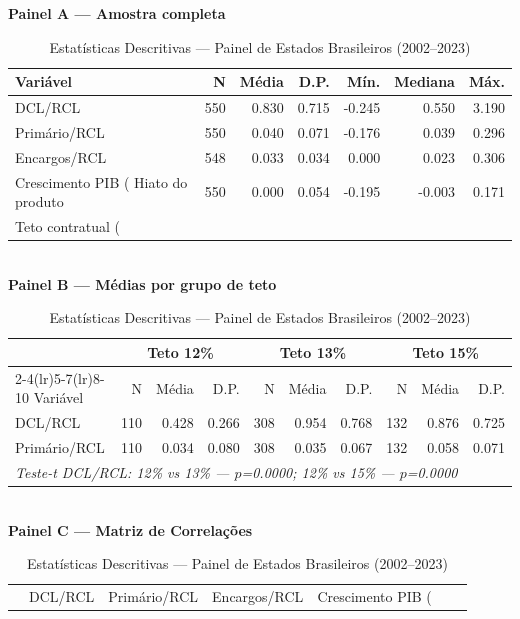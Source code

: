 \begin{table}[htbp]
\caption{Estatísticas Descritivas — Painel de Estados Brasileiros (2002--2023)}
\label{tab:descritivas}
\small

\noindent\textbf{Painel A — Amostra completa}\\[4pt]
\begin{tabular}{lrrrrrr}
\toprule
Variável & N & Média & D.P. & Mín. & Mediana & Máx. \\
\midrule
DCL/RCL & 550 & 0.830 & 0.715 & -0.245 & 0.550 & 3.190 \\
Primário/RCL & 550 & 0.040 & 0.071 & -0.176 & 0.039 & 0.296 \\
Encargos/RCL & 548 & 0.033 & 0.034 & 0.000 & 0.023 & 0.306 \\
Crescimento PIB (%
Hiato do produto & 550 & 0.000 & 0.054 & -0.195 & -0.003 & 0.171 \\
Teto contratual (%
\bottomrule
\end{tabular}\\[12pt]
\noindent\textbf{Painel B — Médias por grupo de teto}\\[4pt]
\begin{tabular}{lrrr@{\hspace{8pt}}rrr@{\hspace{8pt}}rrr}
\toprule
 & \multicolumn{3}{c}{Teto 12\%} & \multicolumn{3}{c}{Teto 13\%} & \multicolumn{3}{c}{Teto 15\%} \\
\cmidrule(lr){2-4}\cmidrule(lr){5-7}\cmidrule(lr){8-10}
Variável & N & Média & D.P. & N & Média & D.P. & N & Média & D.P. \\
\midrule
DCL/RCL & 110 & 0.428 & 0.266 & 308 & 0.954 & 0.768 & 132 & 0.876 & 0.725 \\
Primário/RCL & 110 & 0.034 & 0.080 & 308 & 0.035 & 0.067 & 132 & 0.058 & 0.071 \\
\midrule
\multicolumn{10}{l}{\textit{Teste-t DCL/RCL: 12\% vs 13\% — $p$=0.0000; 12\% vs 15\% — $p$=0.0000}} \\
\bottomrule
\end{tabular}\\[12pt]
\noindent\textbf{Painel C — Matriz de Correlações}\\[4pt]
\begin{tabular}{lrrrrrr}
\toprule
 & DCL/RCL & Primário/RCL & Encargos/RCL & Crescimento PIB (%

\end{tabular}
\end{table}
